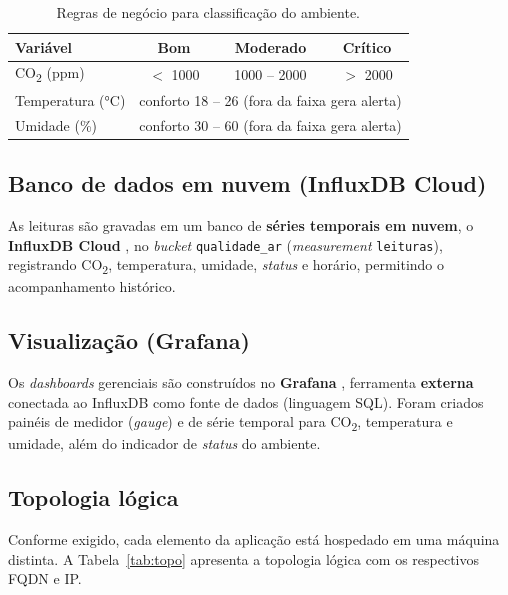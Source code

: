 \documentclass[12pt,a4paper]{article}
\begin{document}
\begin{table}[h]
  \centering
  \caption{Regras de negócio para classificação do ambiente.}
  \label{tab:regras}
  \begin{tabular}{lccc}
    \toprule
    \textbf{Variável} & \textbf{Bom} & \textbf{Moderado} & \textbf{Crítico} \\
    \midrule
    CO\textsubscript{2} (ppm) & $<$ 1000 & 1000 -- 2000 & $>$ 2000 \\
    Temperatura (°C) & \multicolumn{3}{c}{conforto 18 -- 26 (fora da faixa gera alerta)} \\
    Umidade (\%) & \multicolumn{3}{c}{conforto 30 -- 60 (fora da faixa gera alerta)} \\
    \bottomrule
  \end{tabular}
\end{table}

\subsection{Banco de dados em nuvem (InfluxDB Cloud)}
As leituras são gravadas em um banco de \textbf{séries temporais em nuvem}, o \textbf{InfluxDB Cloud}
\cite{influxdata}, no \textit{bucket} \texttt{qualidade\_ar} (\textit{measurement} \texttt{leituras}),
registrando CO\textsubscript{2}, temperatura, umidade, \textit{status} e horário, permitindo o
acompanhamento histórico.

\subsection{Visualização (Grafana)}
Os \textit{dashboards} gerenciais são construídos no \textbf{Grafana} \cite{grafana}, ferramenta
\textbf{externa} conectada ao InfluxDB como fonte de dados (linguagem SQL). Foram criados painéis de
medidor (\textit{gauge}) e de série temporal para CO\textsubscript{2}, temperatura e umidade, além do
indicador de \textit{status} do ambiente.

\subsection{Topologia lógica}
Conforme exigido, cada elemento da aplicação está hospedado em uma máquina distinta. A
Tabela~\ref{tab:topo} apresenta a topologia lógica com os respectivos FQDN e IP.
\end{document}

